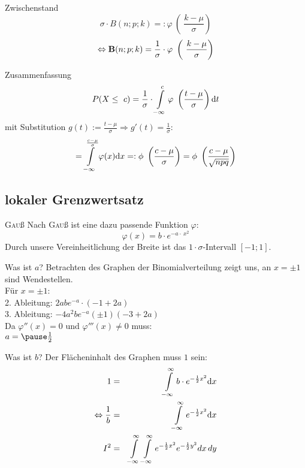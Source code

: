 \documentclass[14pt]{beamer}
\begin{document}
\begin{frame}{Zwischenstand}
$$
\sigma \cdot B(n;p;k) =: \varphi\ \left(\ \frac{k-\mu}{\sigma}\right)
$$
$$
\Leftrightarrow
\begin{mathbf}
B(n;p;k) =  \frac{1}{\sigma} \cdot  \varphi\ \left(\ \frac{k-\mu}{\sigma}\right)
\end{mathbf}
$$
\end{frame}


\begin{frame}{Zusammenfassung}
$$
P(X\leq\ c) = \frac{1}{\sigma} \cdot \int\displaylimits^c_{-\infty} \varphi\ \left(\frac{t-\mu}{\sigma}\right) {\mathrm d}t
$$
mit Substitution $g(t):=\frac{t-\mu}{\sigma} \Rightarrow g'(t)=\frac{1}{\sigma}$:
$$
= \int\displaylimits^{\frac{c-\mu}{\sigma}}_{-\infty} \varphi(x) {\mathrm d}x =: \phi\ \left(\frac{c-\mu}{\sigma}\right) = \phi\ \left( \frac{c-\mu}{\sqrt{npq}}\right)
$$
\end{frame}

\subsection{lokaler Grenzwertsatz}
\begin{frame}{\textrm{\textsc{Gau}ß}}
Nach \textrm{\textsc{Gau}ß} ist eine dazu passende Funktion $\varphi$:
$$
\varphi(x)=b\cdot e^{-a\cdot\ x^2}
$$
Durch unsere Vereinheitlichung der Breite ist das $1\cdot \sigma$-Intervall $[-1;1]$.
\end{frame}


\begin{frame}{Was ist $a$?}
Betrachten des Graphen der Binomialverteilung zeigt uns, an $x=\pm 1$ sind Wendestellen.\\
Für $x=\pm 1$:\\
2. Ableitung: $2abe^{-a} \cdot (-1+2 a)$\\
3. Ableitung: $-4 a^{2} b e^{-a} (\pm1) (-3+2 a)$\\

Da $\varphi''(x)=0$ und $\varphi'''(x)\neq0$ muss:\\
$a=\pause\frac{1}{2}$
\end{frame}

\begin{frame}{Was ist $b$?}
Der Flächeninhalt des Graphen muss $1$ sein:
\begin{eqnarray}
1&=&\int\displaylimits^{\infty}_{-\infty} b \cdot e^{-\frac{1}{2}x^2} {\mathrm d}x \\
\Leftrightarrow \frac{1}{b}&=&\int\displaylimits^{\infty}_{-\infty} e^{-\frac{1}{2}x^2} {\mathrm d}x \\
I^2 &=& \int\displaylimits^{\infty}_{-\infty} \int\displaylimits^{\infty}_{-\infty} e^{-\frac{1}{2}x^2} e^{-\frac{1}{2}y^2} dx \, dy
\end{eqnarray}
\end{frame}
\end{document}

